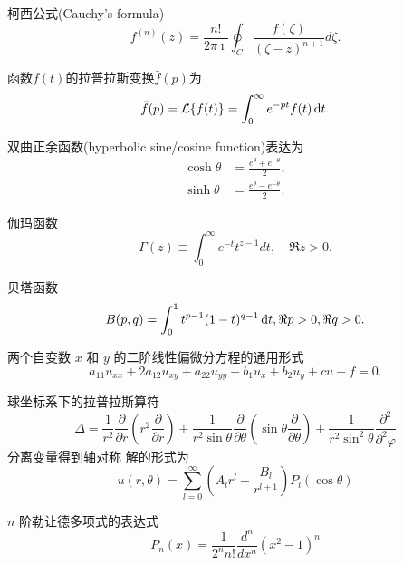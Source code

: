 \documentclass{njustexam}
\begin{document}
\newpage
{} %
柯西公式(Cauchy's formula)
\begin{equation*}
  f^{(n)}(z) = \frac{n!}{2\pi \imath} \oint_C \frac{f(\zeta)}{(\zeta - z)^{n+1}} d \zeta.
  \label{eq:cauchy_formula_nth_derivative}
\end{equation*}

函数$f(t)$的拉普拉斯变换$\bar{f}(p)$为
\begin{equation*}
    \bar{f}(p) = \mathcal{L} \{ f(t) \} = \int_0 ^{\infty} e^{-pt} f(t) \mathop{}\!\mathrm{d} t .
\end{equation*}

双曲正余函数(hyperbolic sine/cosine function)表达为
\begin{align*}
    \cosh \theta &= \frac{e^{\theta} + e^{ - \theta} }{2} ,
    \\
    \sinh \theta &= \frac{e^{\theta} - e^{ - \theta} }{2} .
\end{align*}

伽玛函数
\begin{equation*}
  \Gamma(z) \equiv \int_{0}^{\infty} e^{-t} t^{z-1} d t, \quad \Re z>0 .
\end{equation*}

贝塔函数
\begin{equation*}
    B(p, q) = \int_0^1 t^{p -1} (1-t)^{q-1} \mathop{}\!\mathrm{d} t, \Re p> 0, \Re q >0.
    \label{eq:beta_def1}
\end{equation*}

两个自变数 $x$ 和 $y$ 的二阶线性偏微分方程的通用形式
\begin{equation*}
    a_{11} u_{x x}+2 a_{12} u_{x y}+a_{22} u_{y y}+b_1 u_x+b_2 u_y+c u+f=0.
    \label{eq:two_variable_diff_equation}
\end{equation*}

球坐标系下的拉普拉斯算符
\begin{equation*}
 \Delta = \frac{1}{r^2} \frac{\partial}{\partial r} \left( r^2 \frac{\partial }{\partial r} \right)
  + \frac{1}{r^2\sin \theta} \frac{\partial}{\partial \theta} \left( \sin\theta \frac{\partial}{\partial \theta} \right)
  + \frac{1}{r^2\sin^2 \theta} \frac{\partial^2}{\partial^2 \varphi}
\end{equation*}
分离变量得到轴对称
解的形式为
\begin{equation*}
  u(r, \theta) = \sum_{l=0}^{\infty} \left( A_l r^l + \frac{B_l}{r^{l+1}} \right) P_{l} (\cos \theta)
\end{equation*}

$n$ 阶勒让德多项式的表达式 
$$P_n(x)=\frac{1}{2^n n !} \frac{d^n}{d x^n}\left(x^2-1\right)^n$$
\end{document}
